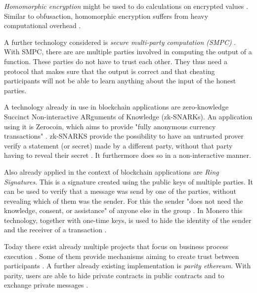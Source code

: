 \documentclass[runningheads]{llncs}
\begin{document}
\textit{Homomorphic encryption} might be used to do calculations on encrypted values . Similar to obfusaction, homomorphic encryption suffers from heavy computational overhead .


A further technology considered is \textit{secure multi-party computation (SMPC)} \cite{orlandi2011multiparty}. With SMPC, there are are multiple parties involved in computing the output of a function. These parties do not have to trust each other. They thus need a protocol that makes sure that the output is correct and that cheating participants will not be able to learn anything about the input of the honest parties. 


A technology already in use in blockchain applications are zero-knowledge Succinct Non-interactive ARguments of Knowledge (zk-SNARKs). An application using it is Zerocoin, which aims to provide "fully anonymous currency transactions" \cite{miers2013zerocoin}. zk-SNARKS provide the possibility to have an untrusted prover verify a statement (or secret) made by a different party, without that party having to reveal their secret \cite{ben2013snarks}. It furthermore does so in a non-interactive manner. 



Also already applied in the context of blockchain applications are \textit{Ring Signatures}. This is a signature created using the public keys of multiple parties. It can be used to verify that a message was send by one of the parties, without revealing which of them was the sender. For this the sender "does not need the knowledge, consent, or assistance" of anyone else in the group  \cite{rivest2001leak}. In Monero this technology, together with one-time keys, is used to hide the identity of the sender and the receiver of a transaction  \cite{noether2016ring}.



Today there exist already multiple projects that focus on business process execution . Some of them provide mechanisms aiming to create trust between participants . A further already existing implementation is  \textit{parity ethereum}. With parity, users are able to hide private contracts in public contracts and to exchange private messages \cite{parity}.
\end{document}
